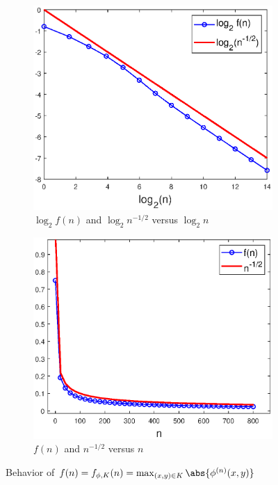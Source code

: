 \documentclass[11pt, letter]{book}
\newenvironment{example}
  {\pushQED{\qed}\renewcommand{\qedsymbol}{$\triangle$}\examplex}
  {\popQED\endexamplex}
\begin{document}
\begin{example}
\begin{figure}[!htb]
    \begin{subfigure}{0.49\textwidth}
    \centering
    \includegraphics[scale=0.58]{Fig5a.eps}
    \caption{$\log_2 f(n)$ and $\log_2 n^{-1/2}$ versus $\log_2 n$}
    \end{subfigure}
    \begin{subfigure}{0.49\textwidth}
    \centering
    \includegraphics[scale=0.58]{Fig5b.eps}
    \caption{$f(n)$ and $n^{-1/2}$ versus $n$}
    \end{subfigure}
    \caption{Behavior of $f(n)=f_{\phi,K}(n)=\max_{(x,y)\in K}\abs{\phi^{(n)}(x,y)}$}
    \label{fig:Conv_Pwr_0_new}
\end{figure}



\end{example}
\end{document}
